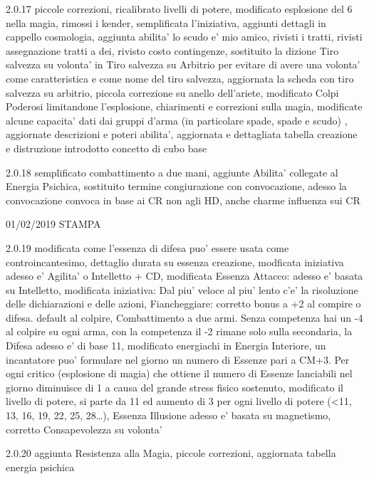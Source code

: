 \documentclass[a4paper,11pt,twoside,openany]{book}
\begin{document}
{{			2.0.17 piccole correzioni, ricalibrato livelli di potere, modificato esplosione del 6 nella magia, rimossi i kender, semplificata l'iniziativa, aggiunti dettagli in cappello cosmologia, aggiunta abilita' lo scudo e' mio amico, rivisti i tratti, rivisti assegnazione tratti a dei, rivisto costo contingenze, sostituito la dizione Tiro salvezza su volonta' in Tiro salvezza su Arbitrio per evitare di avere una volonta' come caratteristica e come nome del tiro salvezza, aggiornata la scheda con tiro salvezza su arbitrio, piccola correzione su anello dell'ariete, modificato Colpi Poderosi limitandone l'esplosione, chiarimenti e correzioni sulla magia, modificate alcune capacita' dati dai gruppi d'arma (in particolare spade, spade e scudo) , aggiornate descrizioni e poteri abilita', aggiornata e dettagliata tabella creazione e distruzione introdotto concetto di cubo base
			
			2.0.18 semplificato combattimento a due mani, aggiunte Abilita' collegate al Energia Psichica, sostituito termine congiurazione con convocazione, adesso la convocazione convoca in base ai CR non agli HD, anche charme influenza sui CR
			
			01/02/2019 STAMPA
			
			2.0.19 modificata come l'essenza di difesa puo' essere usata come controincantesimo, dettaglio durata su essenza creazione, modficata iniziativa adesso e' Agilita' o Intelletto + CD, modificata Essenza Attacco: adesso e' basata su Intelletto, modificata iniziativa: Dal piu' veloce al piu' lento c'e' la risoluzione delle dichiarazioni e delle azioni, Fiancheggiare: corretto bonus a +2 al compire o difesa. default al colpire, Combattimento a due armi. Senza competenza hai un -4 al colpire su ogni arma, con la competenza il -2 rimane solo sulla secondaria, la Difesa adesso e' di base 11, modificato energiachi in Energia Interiore, un incantatore puo' formulare nel giorno un numero di Essenze pari a CM+3. Per ogni critico (esplosione di magia) che ottiene il numero di Essenze lanciabili nel giorno diminuisce di 1 a causa del grande stress fisico sostenuto, modificato il livello di potere, si parte da 11 ed aumento di 3 per ogni livello di potere (\textless11, 13, 16, 19, 22, 25, 28\ldots ), Essenza Illusione adesso e' basata su magnetismo, corretto Consapevolezza su volonta'
			
			2.0.20 aggiunta Resistenza alla Magia, piccole correzioni, aggiornata tabella energia psichica
			
}}
\end{document}
